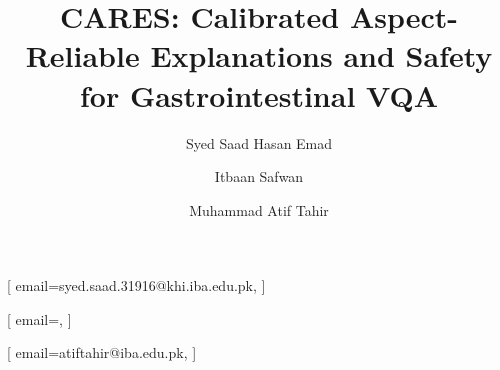 \documentclass{ceurart}
\begin{document}


\title{CARES: Calibrated Aspect-Reliable Explanations and Safety
       for Gastrointestinal VQA}

\author[1]{Syed Saad Hasan Emad}[%
  email=syed.saad.31916@khi.iba.edu.pk,
]

\author[1]{Itbaan Safwan}[%
  email=,
]
\author[1]{Muhammad Atif Tahir}[%
  email=atiftahir@iba.edu.pk,
]
\address[1]{School of Mathematics and Computer Science, Institute of
            Business Administration (IBA), Karachi, Pakistan}
\end{document}
